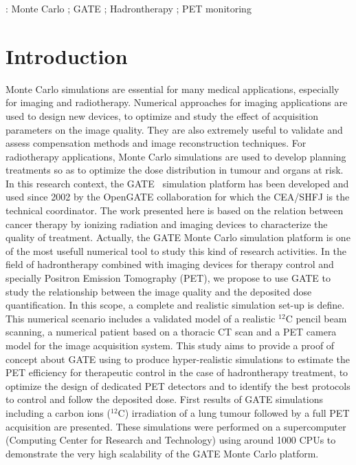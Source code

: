 \documentclass[11pt]{iopart}
\begin{document}
\vspace{2pc}
: Monte Carlo ; GATE ; Hadrontherapy ; PET monitoring
\maketitle


\section{Introduction}
Monte Carlo simulations are essential for many medical applications, especially for imaging and radiotherapy. Numerical approaches for imaging applications are used to design new devices, to optimize and study the effect of acquisition parameters on the image quality. They are also extremely useful to validate and assess compensation methods and image reconstruction techniques. For radiotherapy applications, Monte Carlo simulations are used to develop planning treatments so as to optimize the dose distribution in tumour and organs at risk. In this research context, the GATE~\cite{Jan2004,Jan2011} simulation platform has been developed and used since 2002 by the OpenGATE collaboration for which the CEA/SHFJ is the technical coordinator.
The work presented here is based on the relation between cancer therapy by ionizing radiation and imaging devices to characterize the quality of treatment. Actually, the GATE Monte Carlo simulation platform is one of the most usefull numerical tool to study this kind of research activities. In the field of hadrontherapy combined with imaging devices for therapy control and specially Positron Emission Tomography (PET), we propose to use GATE to study the relationship between the image quality and the deposited dose quantification. In this scope, a complete and realistic simulation set-up is define. This numerical scenario includes a validated model of a realistic $^{12}$C pencil beam scanning, a numerical patient based on a thoracic CT scan and a PET camera model for the image acquisition system. This study aims to provide a proof of concept about GATE using to produce hyper-realistic simulations to estimate the PET efficiency for therapeutic control in the case of hadrontherapy treatment, to optimize the design of dedicated PET detectors and to identify the best protocols to control and follow the deposited dose. First results of GATE simulations including a carbon ions ($^{12}$C) irradiation of a lung tumour followed by a full PET acquisition are presented. These simulations were performed on a supercomputer (Computing Center for Research and Technology) using around 1000 CPUs to demonstrate the very high scalability of the GATE Monte Carlo platform.
\end{document}
